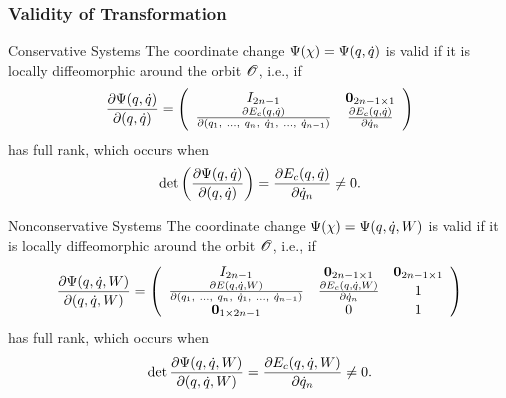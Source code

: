 \begin{frame}[t]
  \frametitle{Validity of Transformation}
   {
    \begin{block}{Conservative Systems}
      The coordinate change $\xform\arx = \xform\argsqdq$ is valid if it is locally
      diffeomorphic around the orbit $\orbit$, i.e., if
      \begin{align*}
        \pd{\xform\argsqdq}{\argsqdq} =
        \left(\begin{array}{c c}
            I_{2n-1} & \boldzero_{2n-1 \times 1}\\
            \pd{\Ec(\q, \dq)}{\xrem} & \pd{\Ec(\q, \dq)}{\dq_{n}}
          \end{array}\right)
      \end{align*}
      has full rank, which occurs when
      \begin{align*}
        \det\left(\pd{\xform\argsqdq}{\argsqdq}\right) =
        \pd{\Ec\argsqdq}{\dq_{n}} \ne 0.
      \end{align*}
    \end{block}
  }
  
   {
    \begin{block}{Nonconservative Systems}
      The coordinate change $\xform\arx = \xform\argsqdqW$ is valid if it is
      locally diffeomorphic around the orbit $\orbit$, i.e., if
      \begin{align*}
        \pd{\xform\argsqdqW}{\argsqdqW} =
        \left(\begin{array}{c c c}
            I_{2n-1} & \boldzero_{2n-1 \times 1} & \boldzero_{2n-1 \times 1}\\
            \pd{\E\argsqdqW}{\xrem} & \pd{\Ec\argsqdqW}{\dq_{n}} & 1\\
            \boldzero_{1 \times 2n-1} & 0 & 1
          \end{array}\right)
      \end{align*}
      has full rank, which occurs when
      \begin{align*}
        \det \pd{\xform\argsqdqW}{\argsqdqW} = \pd{\Ec\argsqdqW}{\dq_{n}} \ne 0.
      \end{align*}
    \end{block}
  }
\end{frame}

